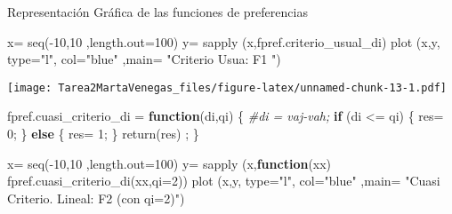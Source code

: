 \documentclass[
]{article}
\newenvironment{Shaded}{\begin{snugshade}}{\end{snugshade}}
\newcommand{\AttributeTok}[1]{\textcolor[rgb]{0.77,0.63,0.00}{#1}}
\newcommand{\CommentTok}[1]{\textcolor[rgb]{0.56,0.35,0.01}{\textit{#1}}}
\newcommand{\ControlFlowTok}[1]{\textcolor[rgb]{0.13,0.29,0.53}{\textbf{#1}}}
\newcommand{\DecValTok}[1]{\textcolor[rgb]{0.00,0.00,0.81}{#1}}
\newcommand{\FunctionTok}[1]{\textcolor[rgb]{0.00,0.00,0.00}{#1}}
\newcommand{\NormalTok}[1]{#1}
\newcommand{\OtherTok}[1]{\textcolor[rgb]{0.56,0.35,0.01}{#1}}
\newcommand{\SpecialCharTok}[1]{\textcolor[rgb]{0.00,0.00,0.00}{#1}}
\newcommand{\StringTok}[1]{\textcolor[rgb]{0.31,0.60,0.02}{#1}}
\begin{document}
Representación Gráfica de las funciones de preferencias

\begin{Shaded}
\begin{Highlighting}[]
\NormalTok{x}\OtherTok{=} \FunctionTok{seq}\NormalTok{(}\SpecialCharTok{{-}}\DecValTok{10}\NormalTok{,}\DecValTok{10}\NormalTok{ ,}\AttributeTok{length.out=}\DecValTok{100}\NormalTok{)}
\NormalTok{y}\OtherTok{=} \FunctionTok{sapply}\NormalTok{ (x,fpref.criterio\_usual\_di)}
\FunctionTok{plot}\NormalTok{ (x,y, }\AttributeTok{type=}\StringTok{"l"}\NormalTok{, }\AttributeTok{col=}\StringTok{"blue"}\NormalTok{ ,}\AttributeTok{main=} \StringTok{"Criterio Usua: F1 "}\NormalTok{)}
\end{Highlighting}
\end{Shaded}

\texttt{[image: Tarea2MartaVenegas\_files/figure-latex/unnamed-chunk-13-1.pdf]}

\begin{Shaded}
\begin{Highlighting}[]
\NormalTok{fpref.cuasi\_criterio\_di }\OtherTok{=} \ControlFlowTok{function}\NormalTok{(di,qi) \{}
              \CommentTok{\#di = vaj{-}vah;}
    \ControlFlowTok{if}\NormalTok{ (di }\SpecialCharTok{\textless{}=}\NormalTok{ qi) \{}
\NormalTok{      res}\OtherTok{=} \DecValTok{0}\NormalTok{;}
\NormalTok{      \} }\ControlFlowTok{else}\NormalTok{ \{}
\NormalTok{        res}\OtherTok{=} \DecValTok{1}\NormalTok{;}
\NormalTok{      \}}
       \FunctionTok{return}\NormalTok{(res) ;}
\NormalTok{  \}}
\end{Highlighting}
\end{Shaded}

\begin{Shaded}
\begin{Highlighting}[]
\NormalTok{x}\OtherTok{=} \FunctionTok{seq}\NormalTok{(}\SpecialCharTok{{-}}\DecValTok{10}\NormalTok{,}\DecValTok{10}\NormalTok{ ,}\AttributeTok{length.out=}\DecValTok{100}\NormalTok{)}
\NormalTok{y}\OtherTok{=} \FunctionTok{sapply}\NormalTok{ (x,}\ControlFlowTok{function}\NormalTok{(xx) }\FunctionTok{fpref.cuasi\_criterio\_di}\NormalTok{(xx,}\AttributeTok{qi=}\DecValTok{2}\NormalTok{))}
\FunctionTok{plot}\NormalTok{ (x,y, }\AttributeTok{type=}\StringTok{"l"}\NormalTok{, }\AttributeTok{col=}\StringTok{"blue"}\NormalTok{ ,}\AttributeTok{main=} \StringTok{"Cuasi Criterio. Lineal: F2 (con qi=2)"}\NormalTok{)}
\end{Highlighting}
\end{Shaded}
\end{document}
